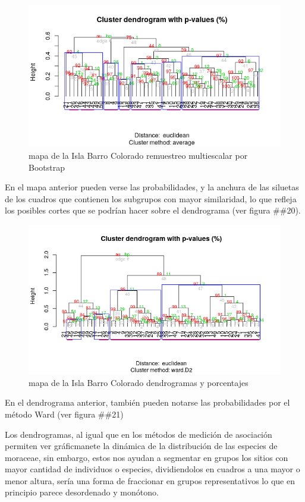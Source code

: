 \documentclass[11pt,]{article}
\begin{document}
\begin{figure}
\centering
\includegraphics[width=1.00000\textwidth]{multiescalar_bootstrap.png}
\caption{mapa de la Isla Barro Colorado remuestreo multiescalar por
Bootstrap \label{fig:bci_map}}
\end{figure}

En el mapa anterior pueden verse las probabilidades, y la anchura de las
siluetas de los cuadros que contienen los subgrupos con mayor
similaridad, lo que refleja los posibles cortes que se podrían hacer
sobre el dendrograma (ver figura \#\#20).

\begin{figure}
\centering
\includegraphics[width=1.00000\textwidth]{agrupamiento_dendrogramas_porcentajes.png}
\caption{mapa de la Isla Barro Colorado dendrogramas y porcentajes
\label{fig:bci_map}}
\end{figure}

En el dendrograma anterior, también pueden notarse las probabilidades
por el método Ward (ver figura \#\#21)

Los dendrogramas, al igual que en los métodos de medición de asociación
permiten ver gráficmanete la dinámica de la distribución de las especies
de moraceae, sin embargo, estos nos ayudan a segmentar en grupos los
sitios con mayor cantidad de individuos o especies, dividiendolos en
cuadros a una mayor o menor altura, sería una forma de fraccionar en
grupos representativos lo que en principio parece desordenado y
monótono.
\end{document}

